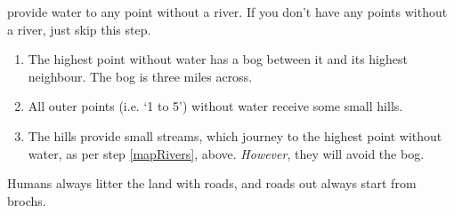 \begin{multicols}{2}
provide water to any point without a river.
If you don't have any points without a river, just skip this step.

\begin{enumerate}
  \item
  The highest point without water has a bog between it and its highest neighbour.
  The bog is three miles across.
  \item
  All outer points (i.e. `1 to 5') without water receive some small hills.
  \item
  The hills provide small streams, which journey to the highest point without water, as per step \ref{mapRivers}, above.
  \textit{However}, they will avoid the bog.
\end{enumerate}

\label{drawRoads}

Humans always litter the land with roads, and roads out always start from \glspl{broch}.


\end{multicols}
